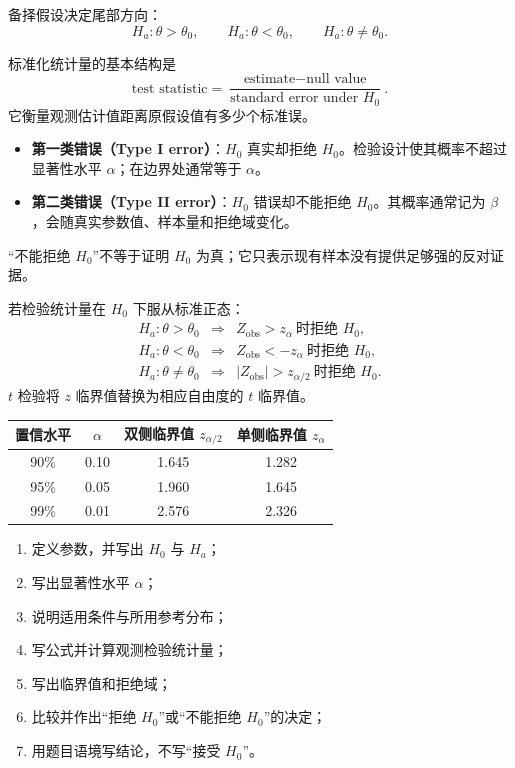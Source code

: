 \documentclass[11pt,a4paper]{article}
\newcommand{\1}{\mathbf{1}}
\begin{document}
备择假设决定尾部方向：
\[
  H_a:\theta>\theta_0,\qquad
  H_a:\theta<\theta_0,\qquad
  H_a:\theta\ne\theta_0.
\]

标准化统计量的基本结构是
\[
  \boxed{
  \text{test statistic}
  =
  \frac{\text{estimate}-\text{null value}}{\text{standard error under }H_0}.
  }
\]
它衡量观测估计值距离原假设值有多少个标准误。

\begin{conceptbox}[第一类错误与第二类错误]
\begin{itemize}
  \item \textbf{第一类错误（Type I error）}：$H_0$ 真实却拒绝 $H_0$。检验设计使其概率不超过显著性水平 $\alpha$；在边界处通常等于 $\alpha$。
  \item \textbf{第二类错误（Type II error）}：$H_0$ 错误却不能拒绝 $H_0$。其概率通常记为 $\beta$，会随真实参数值、样本量和拒绝域变化。
\end{itemize}
“不能拒绝 $H_0$”不等于证明 $H_0$ 为真；它只表示现有样本没有提供足够强的反对证据。
\end{conceptbox}

\begin{memorybox}
若检验统计量在 $H_0$ 下服从标准正态：
\[
\begin{array}{lll}
H_a:\theta>\theta_0 &\Rightarrow& Z_{\mathrm{obs}}>z_\alpha\ \text{时拒绝 }H_0,\\
H_a:\theta<\theta_0 &\Rightarrow& Z_{\mathrm{obs}}<-z_\alpha\ \text{时拒绝 }H_0,\\
H_a:\theta\ne\theta_0 &\Rightarrow& |Z_{\mathrm{obs}}|>z_{\alpha/2}\ \text{时拒绝 }H_0.
\end{array}
\]
$t$ 检验将 $z$ 临界值替换为相应自由度的 $t$ 临界值。
\end{memorybox}

\begin{center}
\begin{tabular}{cccc}
\toprule
置信水平 & $\alpha$ & 双侧临界值 $z_{\alpha/2}$ & 单侧临界值 $z_\alpha$\\
\midrule
90\% & 0.10 & 1.645 & 1.282\\
95\% & 0.05 & 1.960 & 1.645\\
99\% & 0.01 & 2.576 & 2.326\\
\bottomrule
\end{tabular}
\end{center}

\begin{methodbox}[假设检验标准答题模板]
\begin{enumerate}
  \item 定义参数，并写出 $H_0$ 与 $H_a$；
  \item 写出显著性水平 $\alpha$；
  \item 说明适用条件与所用参考分布；
  \item 写公式并计算观测检验统计量；
  \item 写出临界值和拒绝域；
  \item 比较并作出“拒绝 $H_0$”或“不能拒绝 $H_0$”的决定；
  \item 用题目语境写结论，不写“接受 $H_0$”。
\end{enumerate}
\end{methodbox}
\end{document}
